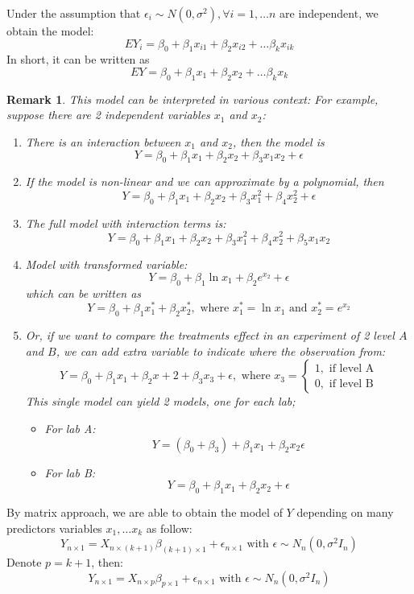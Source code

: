 \documentclass[11pt]{article}
\newtheorem{remark}{Remark}[subsection]
\begin{document}
Under the assumption that $\epsilon_i \sim N(0, \sigma^2), \forall i = 1, \dots n $ are independent, we obtain the model: 
$$EY_i = \beta_0 + \beta_1x_{i1} + \beta_2 x_{i2} + \dots \beta_{k} x_{ik}  $$
In short, it can be written as
$$EY = \beta_0 + \beta_1 x_1 + \beta_2 x_2 + \dots \beta_k x_k  $$
\begin{remark}
	This model can be interpreted in various context:  For example, suppose there are 2 independent variables $x_1$ and $x_2$:
	\begin{enumerate}
		\item There is an interaction between $x_1$ and $x_2$, then the model is 
		$$Y = \beta_0 + \beta_1 x_1 + \beta_2 x_2 + \beta_3 x_1 x_2 +\epsilon$$
		\item If the model is non-linear and we can approximate by a polynomial, then 
		$$Y = \beta_0 + \beta_1 x_1 + \beta_2 x_2 + \beta_3 x_1^2 + \beta_4 x_2^2 + \epsilon$$
		\item The full model with interaction terms is:
		$$Y = \beta_0 + \beta_1 x_1 + \beta_2 x_2 + \beta_3 x_1^2 + \beta_4 x_2^2 + \beta_5 x_1 x_2 $$
		\item Model with transformed variable:
		$$Y = \beta_0 + \beta_1 \ln x_1 + \beta_2 e^{x_2} + \epsilon $$
		which can be written as 
		$$Y = \beta_0 + \beta_1 x_1^* + \beta_2 x_2^* , \text{ where } x_1^*  = \ln x_1 \text{ and } x_2^* = e^{x_2}$$
		\item Or, if we want to compare the treatments effect in an experiment of 2 level $A$ and $B$, we can add extra variable to indicate where the observation from:
		$$Y = \beta_0 + \beta_1 x_1 + \beta_2 x+ 2 + \beta_3 x_3 + \epsilon, \text{ where } x_3 = \begin{cases}
			1 , \text{ if level A} \\ 0, \text{ if level B}
		\end{cases} $$
		This single model can yield 2 models, one for each lab;
		\begin{itemize}
			\item For lab A:
			$$Y = (\beta_0 + \beta_3)  + \beta_1 x_1 + \beta_2 x_2 \epsilon$$
			\item For lab B:
			$$Y = \beta_0 + \beta_1 x_1 + \beta_2 x_2 +\epsilon $$
		\end{itemize}
	\end{enumerate}
\end{remark}
By matrix approach, we are able to obtain the model of $Y$ depending on many predictors variables $x_1, \dots x_k$ as follow:
$$Y_{n \times 1} = X_{n \times (k + 1) } \beta_{(k + 1) \times 1} + \epsilon_{n \times 1} \text{ with } \epsilon \sim N_n\left(0, \sigma^2 I_n\right) $$
Denote $p = k+1$, then:
$$Y_{n \times 1} = X_{n \times p } \beta_{p \times 1} + \epsilon_{n \times 1} \text{ with } \epsilon \sim N_n\left(0, \sigma^2 I_n\right)  $$
\end{document}
